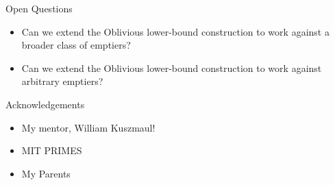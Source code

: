 \documentclass[xcolor=x11names, svgnames, rgb]{beamer}
\begin{document}
\begin{frame}[t]{Open Questions}
  \begin{itemize}
    \item Can we extend the Oblivious lower-bound construction to work against a broader class of emptiers?
    \item Can we extend the Oblivious lower-bound construction to work against arbitrary emptiers?
  \end{itemize}
\end{frame}

\begin{frame}[t]{Acknowledgements}
  \begin{itemize}
    \item My mentor, William Kuszmaul!
    \item MIT PRIMES
    \item My Parents
 \end{itemize} 
\end{frame}
\end{document}
